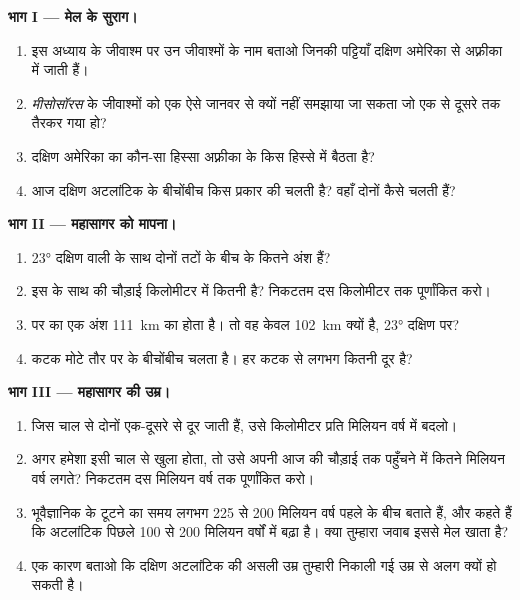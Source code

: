 \begin{problem}
\medskip
\noindent\textbf{भाग I --- मेल के सुराग।}
\begin{enumerate}
  \item इस अध्याय के जीवाश्म  पर उन जीवाश्मों के नाम बताओ जिनकी
        पट्टियाँ दक्षिण अमेरिका से अफ़्रीका में जाती हैं।
  \item \emph{मीसोसॉरस} के जीवाश्मों को एक ऐसे जानवर से क्यों नहीं समझाया जा
        सकता जो एक  से दूसरे तक तैरकर गया हो?
  \item दक्षिण अमेरिका का कौन-सा हिस्सा अफ़्रीका के किस हिस्से में बैठता है?
  \item आज दक्षिण अटलांटिक के बीचोंबीच किस प्रकार की  चलती है? वहाँ
        दोनों  कैसे चलती हैं?
\end{enumerate}

\medskip
\noindent\textbf{भाग II --- महासागर को मापना।}
\begin{enumerate}[resume]
  \item \ang{23} दक्षिण वाली  के साथ दोनों तटों के बीच  के
        कितने अंश हैं?
  \item इस  के साथ  की चौड़ाई किलोमीटर में कितनी है? निकटतम
        दस किलोमीटर तक पूर्णांकित करो।
  \item {} पर  का एक अंश \qty{111}{km} का होता है। तो वह केवल
        \qty{102}{km} क्यों है, \ang{23} दक्षिण पर?
  \item कटक मोटे तौर पर  के बीचोंबीच चलता है। हर  कटक से लगभग कितनी
        दूर है?
\end{enumerate}

\medskip
\noindent\textbf{भाग III --- महासागर की उम्र।}
\begin{enumerate}[resume]
  \item जिस चाल से दोनों  एक-दूसरे से दूर जाती हैं, उसे किलोमीटर प्रति
        मिलियन वर्ष में बदलो।
  \item अगर  हमेशा इसी चाल से खुला होता, तो उसे अपनी आज की चौड़ाई तक
        पहुँचने में कितने मिलियन वर्ष लगते? निकटतम दस मिलियन वर्ष तक
        पूर्णांकित करो।
  \item भूवैज्ञानिक  के टूटने का समय लगभग 225 से 200 मिलियन वर्ष पहले
        के बीच बताते हैं, और कहते हैं कि अटलांटिक पिछले 100 से 200 मिलियन
        वर्षों में बढ़ा है। क्या तुम्हारा जवाब इससे मेल खाता है?
  \item एक कारण बताओ कि दक्षिण अटलांटिक की असली उम्र तुम्हारी निकाली गई उम्र
        से अलग क्यों हो सकती है।
\end{enumerate}
\end{problem}
